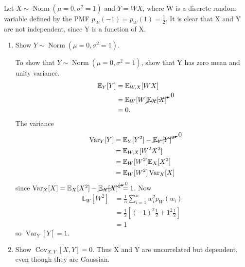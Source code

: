 \begin{example}
	Let $X\sim \operatorname{Norm}(\mu =0, \sigma^2 = 1)$ and $Y = WX$, where W is a discrete random variable defined by the PMF $p_W(-1)=p_W(1)=\frac{1}{2}$. It is clear that X and Y are not independent, since Y is a function of X.
	\begin{enumerate}
		\item Show $Y\sim \operatorname{Norm}(\mu =0, \sigma^2 = 1)$.\newline
		
		To show that $Y\sim \operatorname{Norm}(\mu =0, \sigma^2 = 1)$, show that Y has zero mean and unity variance.
		\begin{equation}
			\begin{split}
				\mathbb{E}_Y[Y] &= \mathbb{E}_{W,X}[WX]\\
				&=\mathbb{E}_W[W]\cancelto{0}{\mathbb{E}_X[X]}\\
				&=0.
			\end{split}
		\end{equation}
		The variance
		\begin{equation}
			\begin{split}
				\operatorname{Var}_Y[Y] &= \mathbb{E}_Y[Y^2]-\cancelto{0}{\mathbb{E}_Y[Y]^2}\\
				& = \mathbb{E}_{W,X}[W^2X^2]\\
				&= \mathbb{E}_W[W^2]\mathbb{E}_X[X^2]\\
				& = \mathbb{E}_W[W^2]\operatorname{Var}_X[X]
			\end{split}
		\end{equation}
		since $\operatorname{Var}_X[X]=\mathbb{E}_X[X^2]-\cancelto{0}{\mathbb{E}_X[X]^2}=1$. Now
		\begin{equation}
			\begin{split}
				\mathbb{E}_W[W^2]&= \frac{1}{n}\sum_{i=1}^nw_i^2p_W(w_i)\\
				&= \frac{1}{2}[(-1)^2\frac{1}{2}+1^2\frac{1}{2}]\\
				&= 1
			\end{split}
		\end{equation}
		so $\operatorname{Var}_Y[Y] =1$.
		\item Show $\operatorname{Cov}_{X,Y}[X,Y]=0$. Thus X and Y are uncorrelated but dependent, even though they are Gaussian.
		

\end{enumerate}
\end{example}
